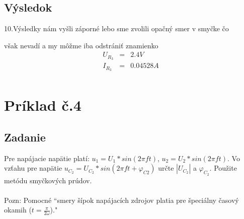 \documentclass[a4paper,oneside,12pt]{article}
\begin{document}
\maketitle
\subsection{Výsledok}

10.Výsledky nám vyšli záporné lebo sme zvolili opačný smer v smyčke čo 

však nevadí a my môžme iba odstrániť znamienko
\begin{eqnarray*}
	U_{R_{3}} &= & 2.4 V\\
	I_{R_{3}} &= & 0.04528 A\\
\end{eqnarray*}

\newpage
\maketitle
\section{Príklad č.4}

\maketitle
\subsection{Zadanie}
Pre napájacie napätie platí: $u_{1} = U_{1} * sin(2\pi ft)$, $u_{2} = U_{2} * sin(2\pi ft)$. Vo vzťahu pre napätie $u_{C_{2}} = U_{C_{2}} * sin(2\pi ft + \varphi_{C{2}})$ určte $|U_{C_{2}}|$ a $\varphi_{C_{2}}$. Použite metódu smyčkových prúdov.
\\
\\
Pozn: Pomocné “smery šípok napájacích zdrojov platia pre špeciálny časový okamih ($t = \frac{\pi}{2\omega}$)."

\begin{table}[ht]
	\centering	
\end{table}
\end{document}
